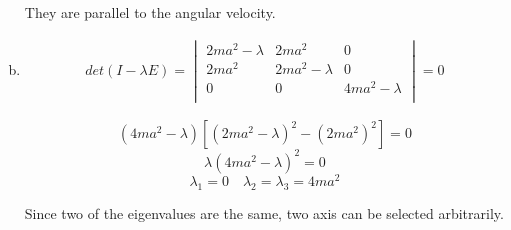 \documentclass{article}
\begin{document}
\begin{enumerate}[(a)]
They are parallel to the angular velocity.

\item
\begin{gather*}
det(I-\lambda E)=
\begin{vmatrix}
	 2ma^2-\lambda  &  2ma^2  &     0	\\
	 2ma^2	&  2ma^2-\lambda  &     0   \\
	    0   & 	  0	  &  4ma^2-\lambda	\\
\end{vmatrix}
=0
\end{gather*}

$$(4ma^2-\lambda)[(2ma^2-\lambda)^2-(2ma^2)^2]=0$$
$$\lambda(4ma^2-\lambda)^2=0$$
$$\lambda_1=0\quad\lambda_2=\lambda_3=4ma^2$$

Since two of the eigenvalues are the same, two axis can be selected arbitrarily.
\end{enumerate}

\section{}
\end{document}

